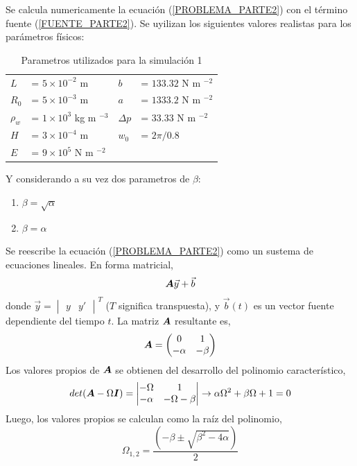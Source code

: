 Se calcula numericamente la ecuación (\ref{PROBLEMA_PARTE2}) con el término fuente (\ref{FUENTE_PARTE2}).  Se uyilizan los siguientes valores realistas para los parámetros físicos:
\begin{table} [H]
\centering
\begin{tabular}{llll}
$L$		& = $5 \times 10 ^ {-2}$ m 				&	$b$	 		&= $133.32$ N m $^{-2}$ \\
$R_0$	& = $5 \times 10 ^ {-3}$ m 				&	$a$		 	&= $1333.2$ N m $^{-2}$ \\
$\rho_w$& = $1 \times 10 ^ {3}$ kg m $^{-3}$ 	&	$\Delta p$ 	&= $33.33$ N m $^{-2}$ \\
$H$		& = $3 \times 10 ^ {-4}$ m 				&	$w_0$ 		&= $2 \pi / 0.8$ \\
$E$		& = $9 \times 10 ^ {5}$ N m $^{-2}$ 	&				&
\end{tabular}
\caption{Parametros utilizados para la simulación 1} \label{PARAMETROS_PARTE2}
\end{table}
Y considerando a su vez dos parametros de $\beta$:
\begin{enumerate}[label=(\alph*)]
\item $\beta = \sqrt{ \alpha }$ 
\item $\beta = \alpha$
\end{enumerate}
Se reescribe la ecuación (\ref{PROBLEMA_PARTE2}) como un sustema de ecuaciones lineales. En forma matricial,
\begin{equation} \label{•}\boldsymbol{A} \vec{y} + \vec{b}
\end{equation}
donde $\vec{y} = \begin{vmatrix} y & y' \end{vmatrix}^T$ ($T$ significa transpuesta), y $\vec{b}(t)$ es un vector fuente dependiente del tiempo $t$. La matriz $\boldsymbol{A}$ resultante es,
\begin{equation}
\boldsymbol{A} = \begin{pmatrix}
0 & 1 \\ -\alpha & -\beta
\end{pmatrix}
\end{equation}
Los valores propios de $\boldsymbol{A}$ se obtienen del desarrollo del polinomio característico,
\begin{equation}
det(\boldsymbol{A} - \Omega \boldsymbol{I}) = \begin{vmatrix}
-\Omega & 1 \\
-\alpha & -\Omega -\beta 
\end{vmatrix} \rightarrow \alpha \Omega^2 + \beta \Omega + 1 = 0
\end{equation}
Luego, los valores propios se calculan como la raíz del polinomio,
\begin{equation}
\Omega_{1,2} = \dfrac{( -\beta \pm \sqrt{ \beta^2 - 4 \alpha})}{2}
\end{equation}

